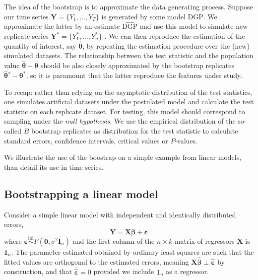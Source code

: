 \documentclass[]{book}
\begin{document}
The idea of the bootstrap is to approximate the data generating process.
Suppose our time series \(\boldsymbol{Y}=\{Y_1, \ldots, Y_T\}\) is
generated by some model \(\mathrm{DGP}\). We approximate the latter by
an estimate \(\widehat{\mathrm{DGP}}\) and use this model to simulate
new replicate series \(\boldsymbol{Y}^*=\{Y_1^* , \ldots , Y_n^*\}\) .
We can then reproduce the estimation of the quantity of interest, say
\(\widehat{\boldsymbol{\theta}}\), by repeating the estimation procedure
over the (new) simulated datasets. The relationship between the test
statistic and the population value
\(\widehat{\boldsymbol{\theta}}-\boldsymbol{\theta}\) should be also
closely approximated by the bootstrap replicates
\(\widehat{\boldsymbol{\theta}}{}^*-\boldsymbol{\theta}^*\), so it is
paramount that the latter reproduce the features under study.

To recap: rather than relying on the asymptotic distribution of the test
statistics, one simulates artificial datasets under the postulated model
and calculate the test statistic on each replicate dataset. For testing,
this model should correspond to sampling under the \emph{null
hypothesis}. We use the empirical distribution of the so-called \(B\)
bootstrap replicates as distribution for the test statistic to calculate
standard errors, confidence intervals, critical values or \(P\)-values.

We illustrate the use of the boostrap on a simple example from linear
models, than detail its use in time series.

\subsection{Bootstrapping a linear
model}\label{bootstrapping-a-linear-model}

Consider a simple linear model with independent and identically
distributed errors,
\[\boldsymbol{Y} = \mathbf{X}\boldsymbol{\beta}+\boldsymbol{\varepsilon}\]
where
\(\boldsymbol{\varepsilon} \stackrel{\mathrm{iid}}{\sim} F(\boldsymbol{0}, \sigma^2\mathbf{I}_n)\)
and the first column of the \(n \times k\) matrix of regressors
\(\mathbf{X}\) is \(\boldsymbol{1}_n\). The parameter estimated obtained
by ordinary least squares are such that the fitted values are orthogonal
to the estimated errors, meaning
\(\mathbf{X}\hat{\boldsymbol{\beta}} \perp \hat{\boldsymbol{\varepsilon}}\)
by construction, and that
\(\overline{\hat{\boldsymbol{\varepsilon}}} = 0\) provided we include
\(\boldsymbol{1}_n\) as a regressor.
\end{document}
